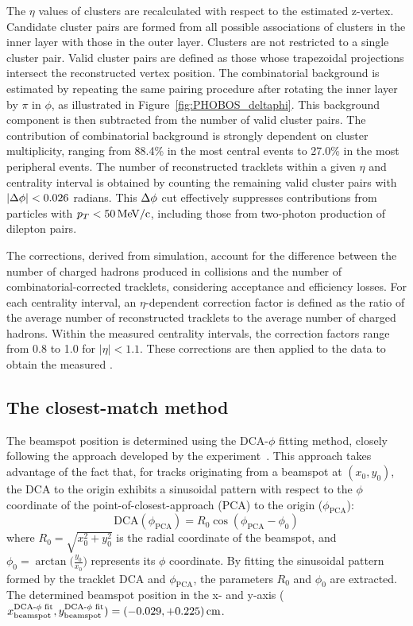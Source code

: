 The $\eta$ values of clusters are recalculated with respect to the estimated z-vertex. Candidate cluster pairs are formed from all possible associations of clusters in the inner layer with those in the outer layer. Clusters are not restricted to a single cluster pair. Valid cluster pairs are defined as those whose trapezoidal projections intersect the reconstructed vertex position. The combinatorial background is estimated by repeating the same pairing procedure after rotating the inner layer by $\pi$ in $\phi$, as illustrated in Figure~\ref{fig:PHOBOS_deltaphi}. This background component is then subtracted from the number of valid cluster pairs. The contribution of combinatorial background is strongly dependent on cluster multiplicity, ranging from 88.4\% in the most central events to 27.0\% in the most peripheral events. The number of reconstructed tracklets within a given $\eta$ and centrality interval is obtained by counting the remaining valid cluster pairs with $|\Delta\phi|<\text{0.026}$ radians. This $\Delta\phi$ cut effectively suppresses contributions from particles with $p_T < 50\mathrm{\,Me\kern -0.1em V}/\text{c}$, including those from two-photon production of dilepton pairs.   

The corrections, derived from simulation, account for the difference between the number of charged hadrons produced in collisions and the number of combinatorial-corrected tracklets, considering acceptance and efficiency losses. For each centrality interval, an $\eta$-dependent correction factor is defined as the ratio of the average number of reconstructed tracklets to the average number of charged hadrons. Within the measured centrality intervals, the correction factors range from 0.8 to 1.0 for $|\eta|<1.1$. These corrections are then applied to the data to obtain the measured \dndeta.

\subsection{The closest-match method}
\label{sec:analysis-closest}
The beamspot position is determined using the DCA-$\phi$ fitting method, closely following the approach developed by the \cms experiment~\cite{Miao:2007zz}. This approach takes advantage of the fact that, for tracks originating from a beamspot at $(x_0,y_0)$, the DCA to the origin exhibits a sinusoidal pattern with respect to the $\phi$ coordinate of the point-of-closest-approach (PCA) to the origin ($\phi_{\text{PCA}}$):
\[
\text{DCA}(\phi_{\text{PCA}})=R_0\cos(\phi_{\text{PCA}}-\phi_0)
\]
where $R_0 = \sqrt{x_0^2 + y_0^2}$ is the radial coordinate of the beamspot, and $\phi_0 = \arctan\big(\frac{y_0}{x_0}\big)$ represents its $\phi$ coordinate. By fitting the sinusoidal pattern formed by the tracklet DCA and $\phi_{\text{PCA}}$, the parameters $R_0$ and $\phi_0$ are extracted.
The determined beamspot position in the x- and y-axis ($x^{\text{DCA-$\phi$ fit}}_{\text{beamspot}}, y^{\text{DCA-$\phi$ fit}}_{\text{beamspot}})=(-0.029, +0.225)\rm \,cm$.

